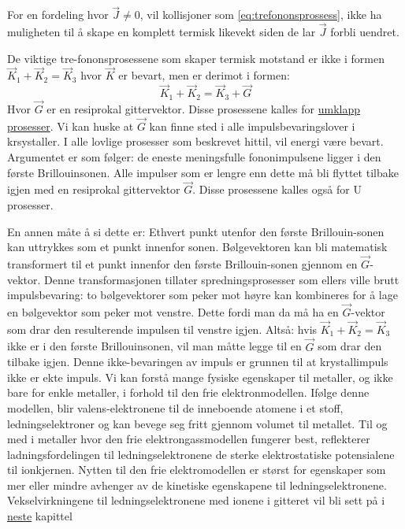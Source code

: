 \documentclass{article}
\begin{document}
For en fordeling hvor $\vec{J} \ne 0$, vil kollisjoner som \ref{eq:trefononsprossess}, ikke ha muligheten til å skape en komplett termisk likevekt siden de lar $\vec{J}$ forbli uendret.

De viktige tre-fononsprosessene som skaper termisk motstand er ikke i formen $\vec{K}_1 + \vec{K}_2 = \vec{K}_3$ hvor $\vec{K}$ er bevart, men er derimot i formen:
\begin{equation}
    \vec{K}_1 + \vec{K}_2 = \vec{K}_3 + \vec{G}
\end{equation}
Hvor $\vec{G}$ er en resiprokal gittervektor. Disse prosessene kalles for \underline{umklapp prosesser}. Vi kan huske at $\vec{G}$ kan finne sted i alle impulsbevaringslover i krsystaller. I alle lovlige prosesser som beskrevet hittil, vil energi være bevart. Argumentet er som følger: de eneste meningsfulle fononimpulsene ligger i den første Brillouinsonen. Alle impulser som er lengre enn dette må bli flyttet tilbake igjen med en resiprokal gittervektor $\vec{G}$. Disse prosessene kalles også for U prosesser. 

En annen måte å si dette er: Ethvert punkt utenfor den første Brillouin-sonen kan uttrykkes som et punkt innenfor sonen. Bølgevektoren kan bli matematisk transformert til et punkt innenfor den første Brillouin-sonen gjennom en $\vec{G}$-vektor. Denne transformasjonen tillater spredningsprosesser som ellers ville brutt impulsbevaring: to bølgevektorer som peker mot høyre kan kombineres for å lage en bølgevektor som peker mot venstre. Dette fordi man da må ha en $\vec{G}$-vektor som drar den resulterende impulsen til venstre igjen. Altså: hvis $\vec{K}_1 + \vec{K}_2 = \vec{K}_3$ ikke er i den første Brillouinsonen, vil man måtte legge til en $\vec{G}$ som drar den tilbake igjen. Denne ikke-bevaringen av impuls er grunnen til at krystallimpuls ikke er ekte impuls.
\nyside
{}
Vi kan forstå mange fysiske egenskaper til metaller, og ikke bare for enkle metaller, i forhold til den frie elektronmodellen. Ifølge denne modellen, blir valens-elektronene til de inneboende atomene i et stoff, ledningselektroner og kan bevege seg fritt gjennom volumet til metallet. Til og med i metaller hvor den frie elektrongassmodellen fungerer best, reflekterer ladningsfordelingen til ledningselektronene de sterke elektrostatiske potensialene til ionkjernen. Nytten til den frie elektromodellen er størst for egenskaper som mer eller mindre avhenger av de kinetiske egenskapene til ledningselektronene. Vekselvirkningene til ledningselektronene med ionene i gitteret vil bli sett på i \underline{neste} kapittel
\end{document}
